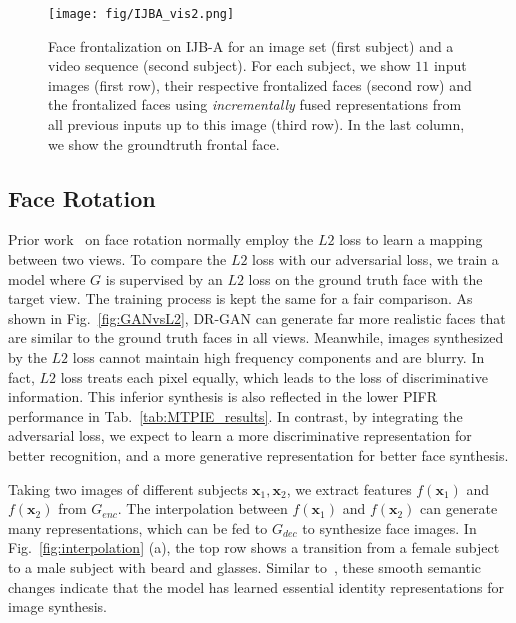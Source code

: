 \documentclass[10pt,journal,compsoc]{IEEEtran}
\begin{document}
\begin{figure*}[t!]
\end{figure*}\begin{figure*}[t!]
\begin{center}
\small
\texttt{[image: fig/IJBA\_vis2.png]}
\vspace{-2mm}
\caption{\small Face frontalization on IJB-A for an image set (first subject) and a video sequence (second subject). 
For each subject, we show $11$ input images (first row), their respective frontalized faces (second row) and the frontalized faces using {\it incrementally} fused representations from all previous inputs up to this image (third row). In the last column, we show the groundtruth frontal face.}
\label{fig:IJBA_num}\figvspace
\end{center}
\end{figure*}\subsection{Face Rotation}
Prior work~\cite{zhu2013deep, yim2015rotating, yang2015weakly} on face rotation normally employ the $L2$ loss to learn a mapping between two views.
To compare the $L2$ loss with our adversarial loss, we train a model where $G$ is supervised by an $L2$ loss on the ground truth face with the target view.
The training process is kept the same for a fair comparison. 
As shown in Fig.~\ref{fig:GANvsL2}, DR-GAN can generate far more realistic faces that are similar to the ground truth faces in all views. 
Meanwhile, images synthesized by the $L2$ loss cannot maintain high frequency components and are blurry. 
In fact, $L2$ loss treats each pixel equally, which leads to the loss of discriminative information. 
This inferior synthesis is also reflected in the lower PIFR performance in Tab.~\ref{tab:MTPIE_results}. 
In contrast, by integrating the adversarial loss, we expect to learn a more discriminative representation for better recognition, and a more generative representation for better face synthesis.

Taking two images of different subjects $\mathbf{x}_1, \mathbf{x}_2$, we extract features $f(\mathbf{x}_1)$ and $f(\mathbf{x}_2)$ from $G_{enc}$. 
The interpolation between $f(\mathbf{x}_1)$ and $f(\mathbf{x}_2)$ can generate many representations, which can be fed to $G_{dec}$ to synthesize face images. 
In Fig.~\ref{fig:interpolation} (a), the top row shows a transition from a female subject to a male subject with beard and glasses. 
Similar to~\cite{radford2015unsupervised}, these smooth semantic changes indicate that the model has learned essential identity representations for image synthesis. 
\end{document}
